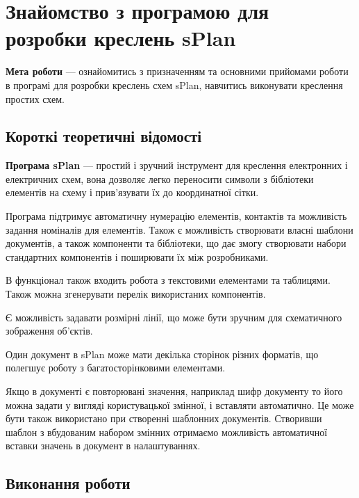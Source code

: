 \chapter[~]{Знайомство з програмою для розробки креслень sPlan}

\textbf{Мета роботи} --- ознайомитись з призначенням та основними прийомами роботи в програмі для
розробки креслень схем sPlan, навчитись виконувати креслення простих схем.


\section{Короткі теоретичні відомості}

\textbf{Програма sPlan} --- простий і зручний інструмент для креслення електронних і електричних
схем, вона дозволяє легко переносити символи з бібліотеки елементів на схему і прив'язувати їх до
координатної сітки.

Програма підтримує автоматичну нумерацію елементів, контактів та можливість задання номіналів для
елементів. Також є можливість створювати власні шаблони документів, а також компоненти та
бібліотеки, що дає змогу створювати набори стандартних компонентів і поширювати їх між розробниками.

В функціонал також входить робота з текстовими елементами та таблицями. Також можна згенерувати
перелік використаних компонентів.

Є можливість задавати розмірні лінії, що може бути зручним для схематичного зображення об'єктів.

Один документ в sPlan може мати декілька сторінок різних форматів, що полегшує роботу з
багатосторінковими елементами.

Якщо в документі є повторювані значення, наприклад шифр документу то його можна задати у вигляді
користувацької змінної, і вставляти автоматично. Це може бути також використано при створенні
шаблонних документів. Створивши шаблон з вбудованим набором змінних отримаємо можливість
автоматичної вставки значень в документ в налаштуваннях.

\section{Виконання роботи}


